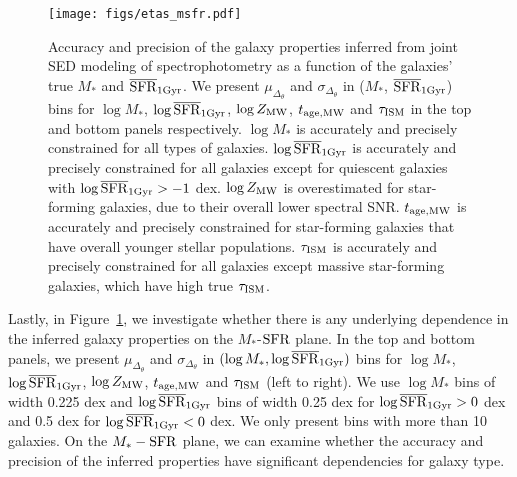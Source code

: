 \begin{figure}
\begin{center}
    \texttt{[image: figs/etas\_msfr.pdf]} 
    \caption{
        Accuracy and precision of the galaxy properties inferred from joint SED
        modeling of spectrophotometry as a function of the galaxies' true $M_*$
        and $\overline{\rm SFR}_{\rm 1Gyr}$. 
        We present $\mu_{\Delta_{\theta}}$ and $\sigma_{\Delta_{\theta}}$ in
        ($M_*$, $\overline{\rm SFR}_{\rm 1Gyr}$) bins for $\log M_*$, $\log\overline{\rm SFR}_{\rm 1Gyr}$, $\log Z_{\rm
        MW}$, $t_{\rm age, MW}$ and $\tau_{\rm ISM}$ in the top and bottom
        panels respectively. 
        $\log M_*$ is accurately and precisely constrained for all types of galaxies. 
        $\log\overline{\rm SFR}_{\rm 1Gyr}$ is accurately and precisely constrained for all galaxies
        except for quiescent galaxies with $\log\overline{\rm SFR}_{\rm 1Gyr} > -1$ dex. 
        $\log Z_{\rm MW}$ is overestimated for star-forming galaxies, due to their
        overall lower spectral SNR. 
        $t_{\rm age, MW}$ is accurately and precisely constrained for star-forming
        galaxies that have overall younger stellar populations. 
        $\tau_{\rm ISM}$ is accurately and precisely constrained for all galaxies
        except massive star-forming galaxies, which have high true $\tau_{\rm ISM}$. 
    }\label{fig:etas_msfr}
\end{center}
\end{figure}

Lastly, in Figure~\ref{fig:etas_msfr}, we investigate whether there is any
underlying dependence in the inferred galaxy properties on the  
$M_*$-${\rm SFR}$ plane. 
In the top and bottom panels, we present $\mu_{\Delta_{\theta}}$ and 
$\sigma_{\Delta_{\theta}}$ in $(\log M_*, \log\overline{\rm SFR}_{\rm 1Gyr})$ bins for 
$\log M_*$, $\log\overline{\rm SFR}_{\rm 1Gyr}$, $\log Z_{\rm MW}$, $t_{\rm age, MW}$ and $\tau_{\rm ISM}$ (left to
right).
We use $\log M_*$ bins of width 0.225 dex and $\log\overline{\rm SFR}_{\rm 1Gyr}$ bins of width 
0.25 dex for $\log \overline{\rm SFR}_{\rm 1Gyr} > 0$ dex and 0.5 dex for $\log \overline{\rm SFR}_{\rm 1Gyr} < 0$ dex. 
We only present bins with more than 10 galaxies. 
On the $M_*-{\rm SFR}$ plane, we can examine whether the accuracy and precision
of the inferred properties have significant dependencies for galaxy type.\\ 

